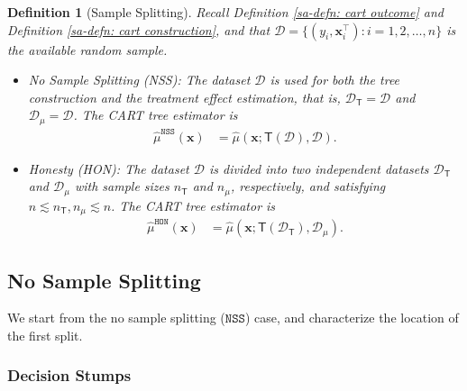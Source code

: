 \documentclass[10pt]{article}
\def\treeT{\mathsf{T}}
\def\bx{\mathbf{x}}
\newtheorem{definition}{Definition}
\theoremstyle{definition}
\theoremstyle{remark}
\begin{document}
\begin{definition}[Sample Splitting]\label{sa-defn: cart sample splitting}
    Recall Definition \ref{sa-defn: cart outcome} and Definition \ref{sa-defn: cart construction}, and that $\mathcal{D} = \{(y_i, \bx^\top_i):i=1,2,\dots,n\}$ is the available random sample.
    \begin{itemize}
        \item \textit{No Sample Splitting} (NSS): The dataset $\mathcal{D}$ is used for both the tree construction and the treatment effect estimation, that is, $\mathcal{D}_{\treeT} = \mathcal{D}$ and $\mathcal{D}_{\mu} = \mathcal{D}$. The CART tree estimator is
        \begin{align*}
            \hat\mu^{\mathtt{NSS}}(\bx)
            &= \hat\mu(\bx; \treeT(\mathcal{D}),\mathcal{D}).
        \end{align*}
    
        \item \textit{Honesty} (HON): The dataset $\mathcal{D}$ is divided into two independent datasets $\mathcal{D}_{\treeT}$ and $\mathcal{D}_{\mu}$ with sample sizes $n_{\treeT}$ and $n_{\mu}$, respectively, and satisfying $n \lesssim n_{\treeT}, n_{\mu} \lesssim n$. The CART tree estimator is
        \begin{align*}
            \hat{\mu}^{\mathtt{HON}}(\bx)
            &= \hat{\mu}(\bx; \treeT(\mathcal{D}_{\treeT}),\mathcal{D}_{\mu}).
        \end{align*}
    \end{itemize}
\end{definition}

\subsection{No Sample Splitting}

We start from the no sample splitting ($\mathtt{NSS}$) case, and characterize the location of the first split. 

\subsubsection*{Decision Stumps}
\end{document}
